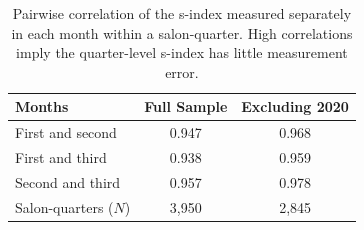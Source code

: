 \begin{table}[ht]
\centering
\caption{Pairwise correlation of the s-index measured separately in each month within a salon-quarter. High correlations imply the quarter-level s-index has little measurement error.} 
\label{tab:sindex_month_corr}
\begin{tabular}{lcc}
  \hline
Months & Full Sample & Excluding 2020 \\ 
  \hline
First and second & 0.947 & 0.968 \\ 
  First and third & 0.938 & 0.959 \\ 
  Second and third & 0.957 & 0.978 \\ 
  Salon-quarters ($N$) & 3,950 & 2,845 \\ 
   \hline
\end{tabular}
\end{table}
